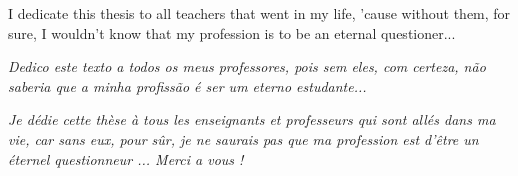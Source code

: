 
\begin{dedicatoria}

I dedicate this thesis to all teachers that went in my life, 'cause without them, for sure, I wouldn't know that my profession is to be an eternal questioner...

\textit{Dedico este texto a todos os meus professores, pois sem eles, com certeza, não saberia que a minha profissão é ser um eterno estudante...}

\textit{Je dédie cette thèse à tous les enseignants et professeurs qui sont allés dans ma vie, car sans eux, pour sûr, je ne saurais pas que ma profession est d'être un éternel questionneur ... Merci a vous !}

\end{dedicatoria}
